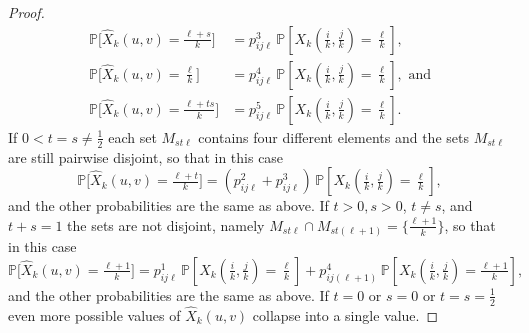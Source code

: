 \documentclass[12pt,a4paper]{amsart}
\theoremstyle{definition}
\newcommand{\Xhat}{\widehat{X}}
\newcommand{\PP}{\mathbb{P}}
\begin{document}
\begin{proof}
\begin{align*}
    \PP\big[\Xhat_k(u,v) = \tfrac{\ell+s}{k}\big] &= p_{ij\ell}^3\, \PP[X_k(\tfrac{i}{k},\tfrac{j}{k}) = \tfrac{\ell}{k}], \\
    \PP\big[\Xhat_k(u,v) = \tfrac{\ell}{k}\big] &= p_{ij\ell}^4\, \PP[X_k(\tfrac{i}{k},\tfrac{j}{k}) = \tfrac{\ell}{k}], \text{ and}\\
    \PP\big[\Xhat_k(u,v) = \tfrac{\ell+ts}{k}\big] &= p_{ij\ell}^5\, \PP[X_k(\tfrac{i}{k},\tfrac{j}{k}) = \tfrac{\ell}{k}]. 
\end{align*}
If $0 < t = s \ne \tfrac12$ each set $M_{st\ell}$ contains four different elements and the sets $M_{st\ell}$ are still pairwise disjoint, so that in this case
$$\PP\big[\Xhat_k(u,v) = \tfrac{\ell+t}{k}\big] = (p_{ij\ell}^2 + p_{ij\ell}^3)\, \PP[X_k(\tfrac{i}{k},\tfrac{j}{k}) = \tfrac{\ell}{k}],$$
and the other probabilities are the same as above. If $t > 0, s > 0$, $t\ne s$, and $t+s=1$ the sets are not disjoint, namely $M_{st\ell} \cap M_{st(\ell+1)} = \{\tfrac{\ell+1}{k}\}$, so that in this case
$$\PP\big[\Xhat_k(u,v) = \tfrac{\ell+1}{k}\big] = p_{ij\ell}^1\, \PP[X_k(\tfrac{i}{k},\tfrac{j}{k}) = \tfrac{\ell}{k}] + p_{ij(\ell+1)}^4\, \PP[X_k(\tfrac{i}{k},\tfrac{j}{k}) = \tfrac{\ell+1}{k}],$$
and the other probabilities are the same as above. If $t=0$ or $s=0$ or $t=s=\tfrac12$ even more possible values of $\Xhat_k(u,v)$ collapse into a single value. 


\end{proof}
\end{document}
